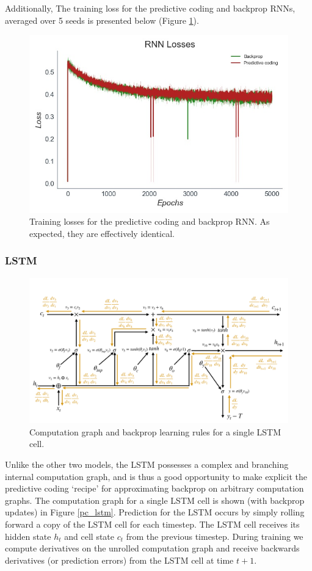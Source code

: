 Additionally, The training loss for the predictive coding and backprop RNNs, averaged over 5 seeds is presented below (Figure \ref{rnn_losses}).

\begin{figure}[ht]
  \centering
  \includegraphics[width=.7\linewidth]{chapter_6_figures/RNN_Losses_super_prelim_6.jpg}  
\caption{Training losses for the predictive coding and backprop RNN. As expected, they are effectively identical.}

\label{rnn_losses}
\end{figure}
\subsubsection{LSTM}
\begin{figure}[ht]
  \centering
  \includegraphics[width=1\linewidth]{chapter_6_figures/backprop_LSTM.pdf}  
\caption{Computation graph and backprop learning rules for a single LSTM cell.}

\label{PC_LSTM}
\end{figure}
Unlike the other two models, the LSTM possesses a complex and branching internal computation graph, and is thus a good opportunity to make explicit the predictive coding `recipe' for approximating backprop on arbitrary computation graphs. The computation graph for a single LSTM cell is shown (with backprop updates) in Figure \ref{pc_lstm}. Prediction for the LSTM occurs by simply rolling forward a copy of the LSTM cell for each timestep. The LSTM cell receives its hidden state $h_t$ and cell state $c_t$ from the previous timestep. During training we compute derivatives on the unrolled computation graph and receive backwards derivatives (or prediction errors) from the LSTM cell at time $t+1$.

